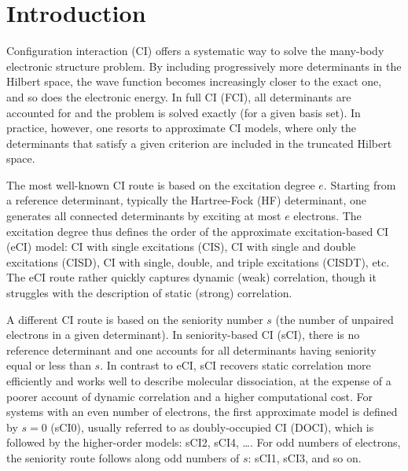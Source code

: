 \documentclass[aip,jcp,reprint,noshowkeys,superscriptaddress]{revtex4-1}
\begin{document}
\maketitle

\section{Introduction}
\label{sec:intro}

Configuration interaction (CI) offers a systematic way to solve the many-body electronic structure problem. \cite{SzaboBook,Helgakerbook}
By including progressively more determinants in the Hilbert space, the wave function becomes increasingly closer to the exact one, and so does the electronic energy.
In full CI (FCI), all determinants are accounted for and the problem is solved exactly (for a given basis set).
In practice, however, one resorts to approximate CI models, where only the determinants that satisfy a given criterion are included in the truncated Hilbert space.

The most well-known CI route is based on the excitation degree $e$.
Starting from a reference determinant, typically the Hartree-Fock (HF) determinant, one generates all connected determinants by exciting at most $e$ electrons.
The excitation degree thus defines the order of the approximate excitation-based CI (eCI) model:
CI with single excitations (CIS), CI with single and double excitations (CISD), CI with single, double, and triple excitations (CISDT), etc.
The eCI route rather quickly captures dynamic (weak) correlation, though it struggles with the description of static (strong) correlation.

A different CI route is based on the seniority number $s$ (the number of unpaired electrons in a given determinant).
In seniority-based CI (sCI), \cite{Bytautas_2011,Allen_1962,Smith_1965,Veillard_1967} there is no reference determinant and one accounts for all determinants having seniority equal or less than $s$.
In contrast to eCI, sCI recovers static correlation more efficiently and works well to describe molecular dissociation, \cite{Bytautas_2015,Alcoba_2014,Alcoba_2014b}
at the expense of a poorer account of dynamic correlation and a higher computational cost.
For systems with an even number of electrons, the first approximate model is defined by $s=0$ (sCI0), usually referred to as doubly-occupied CI (DOCI),
which is followed by the higher-order models: sCI2, sCI4, \ldots.
For odd numbers of electrons, the seniority route follows along odd numbers of $s$: sCI1, sCI3, and so on.
\end{document}
